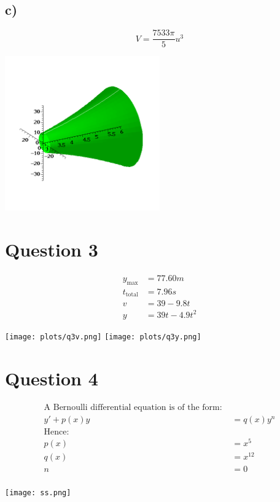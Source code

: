 \documentclass[12pt]{article}
\begin{document}
\subsection*{c)}
\[
    V = \frac{7533 \pi}{5} u^3
\]
\begin{center}\includegraphics[width=0.5\textwidth, trim={2cm 1cm 2cm 3cm},clip]{plots/q2c.png}\end{center}

\newpage
\section*{Question 3}
\begin{align*}
    y_{\text{max}} &= 77.60 m \\
    t_{\text{total}} &= 7.96 s \\
    v &= 39 - 9.8t \\
    y &= 39t -4.9t^2
\end{align*}

\begin{multicols}{2}
    \texttt{[image: plots/q3v.png]}
    \texttt{[image: plots/q3y.png]}
\end{multicols}

\section*{Question 4}
\begin{align*}
    \text{A Bernoulli differential equation is of the form: }\\
    y' + p(x)y &= q(x)y^n\\
    \text{Hence:}\\
    p(x) &= x^5\\
    q(x) &= x^{12}\\
    n &= 0\\
\end{align*}
\begin{center}\texttt{[image: ss.png]}\end{center}
\end{document}

